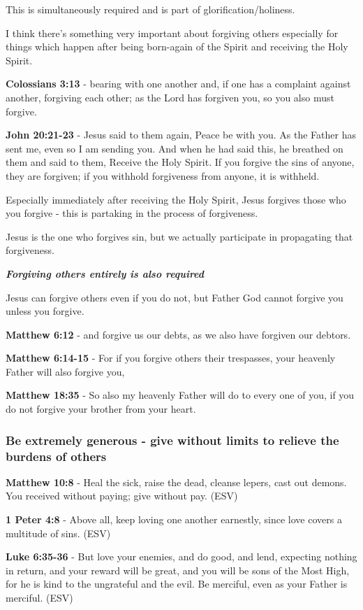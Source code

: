 \documentclass[11pt]{article}
\begin{document}
This is simultaneously required and is part of glorification/holiness.

I think there's something very important about forgiving others especially for things which happen after being born-again of the Spirit and receiving the Holy Spirit.

\textbf{Colossians 3:13} - bearing with one another and, if one has a complaint against another, forgiving each other; as the Lord has forgiven you, so you also must forgive.

\textbf{John 20:21-23} - Jesus said to them again, Peace be with you. As the Father has sent me, even so I am sending you. And when he had said this, he breathed on them and said to them, Receive the Holy Spirit. If you forgive the sins of anyone, they are forgiven; if you withhold forgiveness from anyone, it is withheld.

Especially immediately after receiving the Holy Spirit, Jesus forgives those who you forgive - this is partaking in the process of forgiveness.

Jesus is the one who forgives sin, but we actually participate in propagating that forgiveness.

\emph{\textbf{Forgiving others entirely is also required}}

Jesus can forgive others even if you do not, but Father God cannot forgive you unless you forgive.

\textbf{Matthew 6:12} - and forgive us our debts, as we also have forgiven our debtors.

\textbf{Matthew 6:14-15} - For if you forgive others their trespasses, your heavenly Father will also forgive you,

\textbf{Matthew 18:35} - So also my heavenly Father will do to every one of you, if you do not forgive your brother from your heart.

\subsubsection{Be extremely generous - give without limits to relieve the burdens of others}
\label{sec:org09fe20d}
\textbf{Matthew 10:8} - Heal the sick, raise the dead, cleanse lepers, cast out demons. You received without paying; give without pay. (ESV)

\textbf{1 Peter 4:8} - Above all, keep loving one another earnestly, since love covers a multitude of sins. (ESV)

\textbf{Luke 6:35-36} - But love your enemies, and do good, and lend, expecting nothing in return, and your reward will be great, and you will be sons of the Most High, for he is kind to the ungrateful and the evil. Be merciful, even as your Father is merciful. (ESV)
\end{document}
